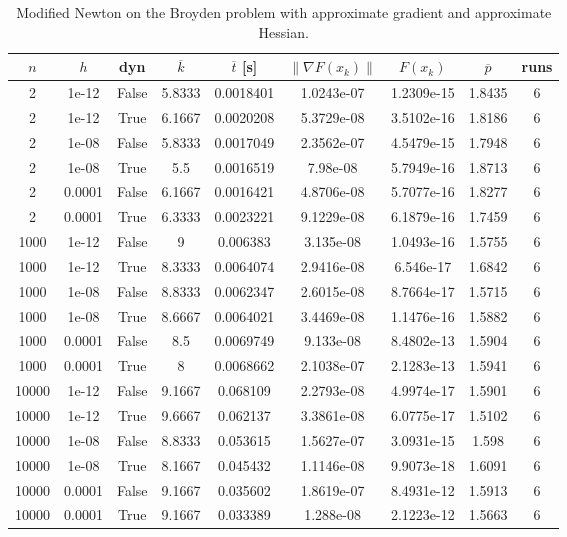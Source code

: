 \begin{table}
\caption{Modified Newton on the Broyden problem with approximate gradient and approximate Hessian.}
\label{tab:mn_broyden_all_aprox}
\begin{tabular}{ccccccccc}
\toprule
$n$ & $h$ & dyn & $\overline{k}$ & $\overline{t}$ [s] & $\|\nabla F(x_k)\|$ & $F(x_k)$ & $\overline{p}$ & runs \\
\midrule
2 & 1e-12 & False & 5.8333 & 0.0018401 & 1.0243e-07 & 1.2309e-15 & 1.8435 & 6 \\
2 & 1e-12 & True & 6.1667 & 0.0020208 & 5.3729e-08 & 3.5102e-16 & 1.8186 & 6 \\
2 & 1e-08 & False & 5.8333 & 0.0017049 & 2.3562e-07 & 4.5479e-15 & 1.7948 & 6 \\
2 & 1e-08 & True & 5.5 & 0.0016519 & 7.98e-08 & 5.7949e-16 & 1.8713 & 6 \\
2 & 0.0001 & False & 6.1667 & 0.0016421 & 4.8706e-08 & 5.7077e-16 & 1.8277 & 6 \\
2 & 0.0001 & True & 6.3333 & 0.0023221 & 9.1229e-08 & 6.1879e-16 & 1.7459 & 6 \\
1000 & 1e-12 & False & 9 & 0.006383 & 3.135e-08 & 1.0493e-16 & 1.5755 & 6 \\
1000 & 1e-12 & True & 8.3333 & 0.0064074 & 2.9416e-08 & 6.546e-17 & 1.6842 & 6 \\
1000 & 1e-08 & False & 8.8333 & 0.0062347 & 2.6015e-08 & 8.7664e-17 & 1.5715 & 6 \\
1000 & 1e-08 & True & 8.6667 & 0.0064021 & 3.4469e-08 & 1.1476e-16 & 1.5882 & 6 \\
1000 & 0.0001 & False & 8.5 & 0.0069749 & 9.133e-08 & 8.4802e-13 & 1.5904 & 6 \\
1000 & 0.0001 & True & 8 & 0.0068662 & 2.1038e-07 & 2.1283e-13 & 1.5941 & 6 \\
10000 & 1e-12 & False & 9.1667 & 0.068109 & 2.2793e-08 & 4.9974e-17 & 1.5901 & 6 \\
10000 & 1e-12 & True & 9.6667 & 0.062137 & 3.3861e-08 & 6.0775e-17 & 1.5102 & 6 \\
10000 & 1e-08 & False & 8.8333 & 0.053615 & 1.5627e-07 & 3.0931e-15 & 1.598 & 6 \\
10000 & 1e-08 & True & 8.1667 & 0.045432 & 1.1146e-08 & 9.9073e-18 & 1.6091 & 6 \\
10000 & 0.0001 & False & 9.1667 & 0.035602 & 1.8619e-07 & 8.4931e-12 & 1.5913 & 6 \\
10000 & 0.0001 & True & 9.1667 & 0.033389 & 1.288e-08 & 2.1223e-12 & 1.5663 & 6 \\

\end{tabular}
\end{table}
